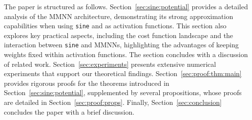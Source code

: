 \documentclass[11pt,a4paper]{article}
\begin{document}





The paper is structured as follows. Section~\ref{sec:sine:potential} provides a detailed analysis of the MMNN architecture, demonstrating its strong approximation capabilities when using \texttt{sine} and  as activation functions. This section also explores key practical aspects, including the cost function landscape and the interaction between \texttt{sine} and MMNNs, highlighting the advantages of keeping weights fixed within activation functions.
The section concludes with a discussion of related work.
Section~\ref{sec:experiments} presents extensive numerical experiments that support our theoretical findings. Section~\ref{sec:proof:thm:main} provides rigorous proofs for the theorems introduced in Section~\ref{sec:sine:potential}, supplemented by several propositions, whose proofs are detailed in Section~\ref{sec:proof:props}.
Finally, Section~\ref{sec:conclusion} concludes the paper with a brief discussion.
\end{document}
